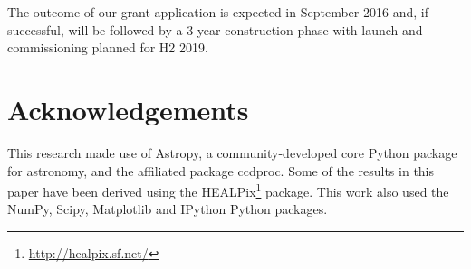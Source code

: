 \documentclass[]{iac}
\begin{document}
The outcome of our grant application is expected in September 2016 and, if successful, will be followed by a 3
year construction phase with launch and commissioning planned for H2 2019.

\section*{Acknowledgements}

This research made use of Astropy, a community-developed core Python package for astronomy\cite{Robitaille2013}, and the
affiliated package ccdproc\cite{Craig2015}. Some of the results in this paper have been derived using the
HEALPix\footnote{\url{http://healpix.sf.net/}}\cite{Gorski2004} package. This work also used the
NumPy\cite{VanderWalt2011}, Scipy\cite{Jones2001}, Matplotlib\cite{Hunter2007} and IPython\cite{Perez2007} Python
packages.


\end{document}
